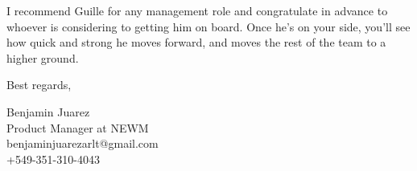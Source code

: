 \documentclass{article}
\begin{document}
I recommend Guille for any management role and congratulate in advance to whoever is considering to getting him on board. Once he's on your side, you'll see how quick and strong he moves forward, and moves the rest of the team to a higher ground.

Best regards, 

Benjamin Juarez  \\
Product Manager at NEWM  \\
benjaminjuarezarlt@gmail.com  \\
+549-351-310-4043


% 

% 
% 
% 
\end{document}
